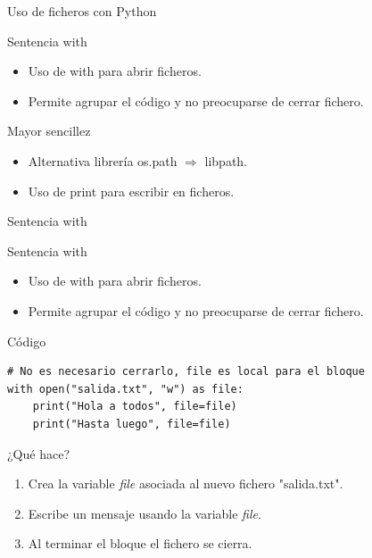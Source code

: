\documentclass[bigger,unknownkeysallowed]{beamer}
\begin{document}
\begin{frame}[label={sec:org6985e46}]{Uso de ficheros con Python}
\begin{block}{Sentencia with}
\begin{itemize}
\item Uso de \alert{with} para abrir ficheros.

\item Permite agrupar el código y no preocuparse de cerrar fichero.
\end{itemize}
\end{block}

\begin{block}{Mayor sencillez}
\begin{itemize}
\item Alternativa librería os.path \(\Rightarrow\) libpath.

\item Uso de print para escribir en ficheros.
\end{itemize}
\end{block}
\end{frame}

\begin{frame}[fragile,label={sec:org4b207cb}]{Sentencia with}
 \begin{block}{Sentencia with}
\begin{itemize}
\item Uso de \alert{with} para abrir ficheros.

\item Permite agrupar el código y no preocuparse de cerrar fichero.
\end{itemize}
\end{block}

\begin{exampleblock}{Código}
\begin{verbatim}
# No es necesario cerrarlo, file es local para el bloque
with open("salida.txt", "w") as file:
    print("Hola a todos", file=file)
    print("Hasta luego", file=file)
\end{verbatim}
\end{exampleblock}

\begin{block}{¿Qué hace?}
\begin{enumerate}
\item Crea la variable \emph{file} asociada al nuevo fichero "salida.txt".

\item Escribe un mensaje usando la variable \emph{file}.

\item Al terminar el bloque el fichero se cierra.
\end{enumerate}
\end{block}
\end{frame}
\end{document}
